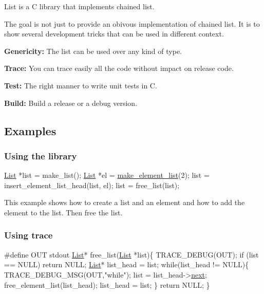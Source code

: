 List is a C library that implements chained list.

The goal is not just to provide an obivous implementation of chained list. It is to show several development tricks that can be used in different context.


\begin{DoxyItemize}
\item {\bfseries Genericity\+:} The list can be used over any kind of type.
\item {\bfseries Trace\+:} You can trace easily all the code without impact on release code.
\item {\bfseries Test\+:} The right manner to write unit tests in C.
\item {\bfseries Build\+:} Build a release or a debug version.
\end{DoxyItemize}

\subsection*{Examples}

\subsubsection*{Using the library}


\begin{DoxyCode}
\hyperlink{struct___list}{List} *list = make\_list();
\hyperlink{struct___list}{List} *el = \hyperlink{list_8h_a7f68324a696f1376fc23fba2f0b1474b}{make\_element\_list}(2);
list = insert\_element\_list\_head(list, el);
list = free\_list(list);
\end{DoxyCode}


This example shows how to create a list and an element and how to add the element to the list. Then free the list. 



\subsubsection*{Using trace}


\begin{DoxyCode}
\textcolor{preprocessor}{#define OUT stdout}
\hyperlink{struct___list}{List}* free\_list(\hyperlink{struct___list}{List} *list)\{
  TRACE\_DEBUG(OUT);
  \textcolor{keywordflow}{if} (list == NULL) \textcolor{keywordflow}{return} NULL;
  \hyperlink{struct___list}{List}* list\_head = list;
  \textcolor{keywordflow}{while}(list\_head != NULL)\{
    TRACE\_DEBUG\_MSG(OUT,\textcolor{stringliteral}{"while"});
    list = list\_head->\hyperlink{struct___list_a0958fa1357a2c1c8fd6e8a3f3156c9b1}{next};
    free\_element\_list(list\_head);
    list\_head = list;
  \}
  \textcolor{keywordflow}{return} NULL;
\}
\end{DoxyCode}


